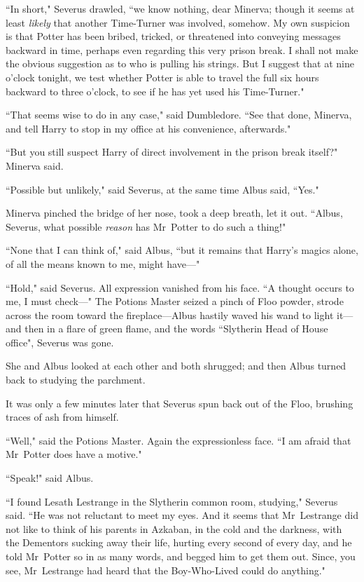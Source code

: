 ``In short," Severus drawled, ``we know nothing, dear Minerva; though it seems at least \emph{likely} that another Time-Turner was involved, somehow. My own suspicion is that Potter has been bribed, tricked, or threatened into conveying messages backward in time, perhaps even regarding this very prison break. I shall not make the obvious suggestion as to who is pulling his strings. But I suggest that at nine o'clock tonight, we test whether Potter is able to travel the full six hours backward to three o'clock, to see if he has yet used his Time-Turner."

``That seems wise to do in any case," said Dumbledore. ``See that done, Minerva, and tell Harry to stop in my office at his convenience, afterwards."

``But you still suspect Harry of direct involvement in the prison break itself?" Minerva said.

``Possible but unlikely," said Severus, at the same time Albus said, ``Yes."

Minerva pinched the bridge of her nose, took a deep breath, let it out. ``Albus, Severus, what possible \emph{reason} has Mr~Potter to do such a thing!"

``None that I can think of," said Albus, ``but it remains that Harry's magics alone, of all the means known to me, might have—"

``Hold," said Severus. All expression vanished from his face. ``A thought occurs to me, I must check—" The Potions Master seized a pinch of Floo powder, strode across the room toward the fireplace—Albus hastily waved his wand to light it—and then in a flare of green flame, and the words ``Slytherin Head of House office", Severus was gone.

She and Albus looked at each other and both shrugged; and then Albus turned back to studying the parchment.

It was only a few minutes later that Severus spun back out of the Floo, brushing traces of ash from himself.

``Well," said the Potions Master. Again the expressionless face. ``I am afraid that Mr~Potter does have a motive."

``Speak!" said Albus.

``I found Lesath Lestrange in the Slytherin common room, studying," Severus said. ``He was not reluctant to meet my eyes. And it seems that Mr~Lestrange did not like to think of his parents in Azkaban, in the cold and the darkness, with the Dementors sucking away their life, hurting every second of every day, and he told Mr~Potter so in as many words, and begged him to get them out. Since, you see, Mr~Lestrange had heard that the Boy-Who-Lived could do anything."

